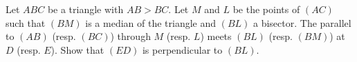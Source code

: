 Let $ABC$ be a triangle with $AB > BC$. Let $M$ and $L$ be the points of $(AC)$ such that $(BM)$ is a median of the triangle and $(BL)$ a bisector. The parallel to $(AB)$ (resp. $(BC)$) through $M$ (resp. $L$) meets $(BL)$ (resp. $(BM)$) at $D$ (resp. $E$). Show that $(ED)$ is perpendicular to $(BL)$.
